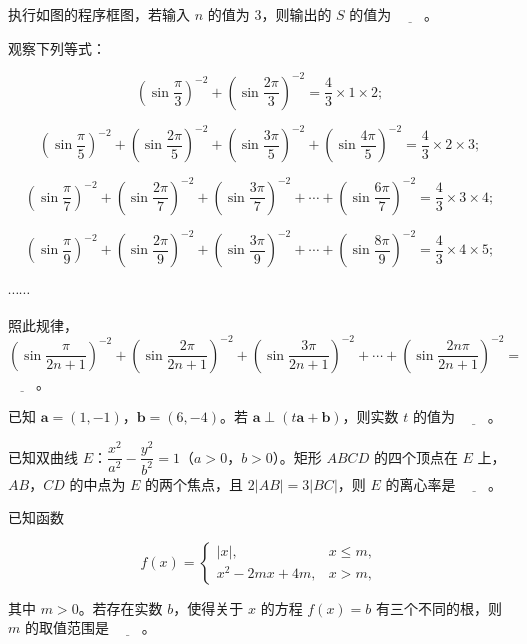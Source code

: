 \Needspace{0.4\textheight}
\begin{question}
执行如图的程序框图，若输入 \(n\) 的值为 3，则输出的 \(S\) 的值为 \(\underline{\qquad}\)。
\nopagebreak[4]
\begin{center}\end{center}
\nopagebreak[4]
\end{question}
\begin{question}
观察下列等式：

\nopagebreak[4]
\[
\left(\sin\dfrac{\pi}{3}\right)^{-2}+\left(\sin\dfrac{2\pi}{3}\right)^{-2}=\dfrac{4}{3}\times 1\times 2;
\]

\nopagebreak[4]
\[
\left(\sin\dfrac{\pi}{5}\right)^{-2}+\left(\sin\dfrac{2\pi}{5}\right)^{-2}+\left(\sin\dfrac{3\pi}{5}\right)^{-2}+\left(\sin\dfrac{4\pi}{5}\right)^{-2}=\dfrac{4}{3}\times 2\times 3;
\]

\nopagebreak[4]
\[
\left(\sin\dfrac{\pi}{7}\right)^{-2}+\left(\sin\dfrac{2\pi}{7}\right)^{-2}+\left(\sin\dfrac{3\pi}{7}\right)^{-2}+\cdots+\left(\sin\dfrac{6\pi}{7}\right)^{-2}=\dfrac{4}{3}\times 3\times 4;
\]

\nopagebreak[4]
\[
\left(\sin\dfrac{\pi}{9}\right)^{-2}+\left(\sin\dfrac{2\pi}{9}\right)^{-2}+\left(\sin\dfrac{3\pi}{9}\right)^{-2}+\cdots+\left(\sin\dfrac{8\pi}{9}\right)^{-2}=\dfrac{4}{3}\times 4\times 5;
\]

\(\cdots\cdots\)

照此规律，\(\left(\sin\dfrac{\pi}{2n+1}\right)^{-2}+\left(\sin\dfrac{2\pi}{2n+1}\right)^{-2}+\left(\sin\dfrac{3\pi}{2n+1}\right)^{-2}+\cdots+\left(\sin\dfrac{2n\pi}{2n+1}\right)^{-2}=\) \(\underline{\qquad}\)。

\end{question}
\begin{question}
已知 \(\boldsymbol{a}=(1,-1)\)，\(\boldsymbol{b}=(6,-4)\)。若 \(\boldsymbol{a}\perp(t\boldsymbol{a}+\boldsymbol{b})\)，则实数 \(t\) 的值为 \(\underline{\qquad}\)。

\end{question}
\begin{question}
已知双曲线 \(E\)：\(\dfrac{x^2}{a^2}-\dfrac{y^2}{b^2}=1\)（\(a>0\)，\(b>0\)）。矩形 \(ABCD\) 的四个顶点在 \(E\) 上，\(AB\)，\(CD\) 的中点为 \(E\) 的两个焦点，且 \(2|AB|=3|BC|\)，则 \(E\) 的离心率是 \(\underline{\qquad}\)。

\end{question}
\begin{question}
已知函数

\nopagebreak[4]
\[
f(x)=
\begin{cases}
|x|, & x\leqslant m,\\
x^2-2mx+4m, & x>m,
\end{cases}
\]

其中 \(m>0\)。若存在实数 \(b\)，使得关于 \(x\) 的方程 \(f(x)=b\) 有三个不同的根，则 \(m\) 的取值范围是 \(\underline{\qquad}\)。

\end{question}


